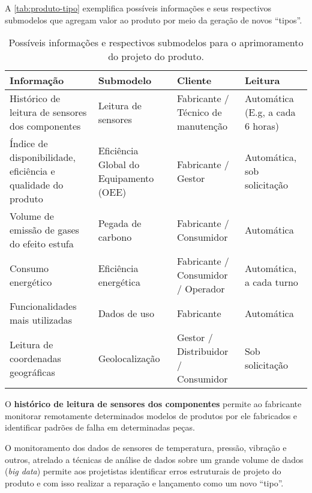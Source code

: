	A \autoref{tab:produto-tipo} exemplifica possíveis informações e seus respectivos submodelos que agregam valor ao produto por meio da geração de novos ``tipos''.
	
	\begin{table}[htb]
		\centering
		\caption{Possíveis informações e respectivos submodelos para o aprimoramento do projeto do produto.}
		\label{tab:produto-tipo}
		\begin{tabular}{p{4cm}p{3cm}p{3cm}p{4cm}}
			
			\hline
			\textbf{Informação}
			& \textbf{Submodelo}
			& \textbf{Cliente}
			& \textbf{Leitura}	
			\\ 
			
			\hline
			Histórico de leitura de sensores dos componentes
			& Leitura de sensores
			& Fabricante / Técnico de manutenção
			& Automática (E.g, a cada 6 horas)
			\\
			
			\hline
			Índice de disponibilidade, eficiência e qualidade do produto
			& Eficiência Global do Equipamento (OEE)
			& Fabricante / Gestor
			& Automática, sob solicitação
			\\
			
			\hline
			Volume de emissão de gases do efeito estufa
			& Pegada de carbono
			& Fabricante / Consumidor
			& Automática
			\\
			
			\hline
			Consumo energético
			& Eficiência energética
			& Fabricante / Consumidor / Operador
			& Automática, a cada turno
			\\
			
			\hline
			Funcionalidades mais utilizadas
			& Dados de uso
			& Fabricante
			& Automática
			\\
			
			\hline
			Leitura de coordenadas geográficas
			& Geolocalização
			& Gestor / Distribuidor / Consumidor
			& Sob solicitação
			\\

			
			\hline
		\end{tabular}
	\end{table}

	O \textbf{histórico de leitura de sensores dos componentes} permite ao fabricante monitorar remotamente determinados modelos de produtos por ele fabricados e identificar padrões de falha em determinadas peças.
	
	O monitoramento dos dados de sensores de temperatura, pressão, vibração e outros, atrelado a técnicas de análise de dados sobre um grande volume de dados (\textit{big data}) permite aos projetistas identificar erros estruturais de projeto do produto e com isso realizar a reparação e lançamento como um novo ``tipo''.
	
